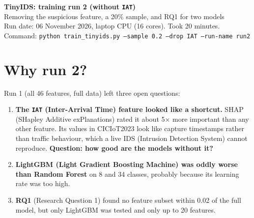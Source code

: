 \documentclass[11pt]{article}
\begin{document}
{\LARGE\bfseries TinyIDS: training run 2 (without \texttt{IAT})}\\[4pt]
{\large Removing the suspicious feature, a 20\% sample, and RQ1 for two models}\\[2pt]
Run date: 06 November 2026, laptop CPU (16 cores). Took 20 minutes. Command:
\texttt{python train\_tinyids.py --sample 0.2 --drop IAT --run-name run2}

\tableofcontents

\newpage
\section{Why run 2?}
Run 1 (all 46 features, full data) left three open questions:
\begin{enumerate}
\item \textbf{The \texttt{IAT} (Inter-Arrival Time) feature looked like a shortcut.} SHAP (SHapley Additive exPlanations) rated it about 5$\times$ more important
than any other feature. Its values in CICIoT2023 look like capture timestamps rather than traffic behaviour, which a live IDS (Intrusion Detection System)
cannot reproduce. \textbf{Question: how good are the models without it?}
\item \textbf{LightGBM (Light Gradient Boosting Machine) was oddly worse than Random Forest} on 8 and 34 classes, probably because its learning rate was too high.
\item \textbf{RQ1} (Research Question 1) found no feature subset within 0.02 of the full model, but only LightGBM was tested and only up to 20 features.
\end{enumerate}
\end{document}
